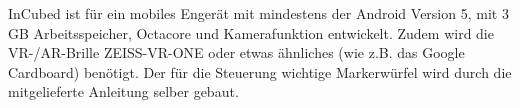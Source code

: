 
InCubed ist für ein mobiles Engerät mit mindestens der Android Version 5, mit 3 GB Arbeitsspeicher, Octacore und Kamerafunktion entwickelt. Zudem wird die VR-/AR-Brille ZEISS-VR-ONE oder etwas ähnliches (wie z.B. das Google Cardboard) benötigt. Der für die Steuerung wichtige Markerwürfel wird durch die mitgelieferte Anleitung selber gebaut.